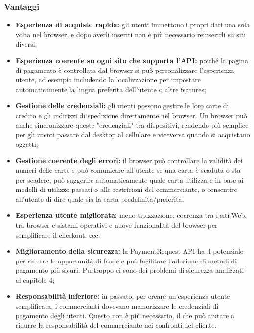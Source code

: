 \documentclass[11pt ,a4paper , twoside , openright ]{article}
\begin{document}
\subsubsection{Vantaggi}
\begin{itemize}
	\item \textbf{Esperienza di acquisto rapida:} gli utenti immettono i propri dati una sola volta nel browser, e dopo averli inseriti non è più necessario reinserirli su siti diversi;
	\item \textbf{Esperienza coerente su ogni sito che supporta l'API:} poiché la pagina di pagamento è controllata dal browser si può personalizzare l'esperienza utente, ad esempio includendo la localizzazione per impostare automaticamente la lingua preferita dell'utente o altre features;
	\item \textbf{Gestione delle credenziali:} gli utenti possono gestire le loro carte di credito e gli indirizzi di spedizione direttamente nel browser. Un browser può anche sincronizzare queste "credenziali" tra dispositivi, rendendo più semplice per gli utenti passare dal desktop al cellulare e viceversa quando si acquistano oggetti;
	\item \textbf{Gestione coerente degli errori:} il browser può controllare la validità dei numeri delle carte e può comunicare all'utente se una carta è scaduta o sta per scadere, può suggerire automaticamente quale carta utilizzare in base ai modelli di utilizzo passati o alle restrizioni del commerciante, o consentire all'utente di dire quale sia la carta predefinita/preferita;
	\item \textbf{Esperienza utente migliorata:} meno tipizzazione, coerenza tra i siti Web, tra browser e sistemi operativi e nuove funzionalità del browser per semplificare il checkout, ecc;
	\item \textbf{Miglioramento della sicurezza:} la PaymentRequest API ha il potenziale per ridurre le opportunità di frode e può facilitare l'adozione di metodi di pagamento più sicuri. Purtroppo ci sono dei problemi di sicurezza analizzati al capitolo 4; 
	\item \textbf{Responsabilità inferiore:} in passato, per creare un'esperienza utente semplificata, i commercianti dovevano memorizzare le credenziali di pagamento degli utenti. Questo non è più necessario, il che può aiutare a ridurre la responsabilità del commerciante nei confronti del cliente.
\end{itemize}
\end{document}
